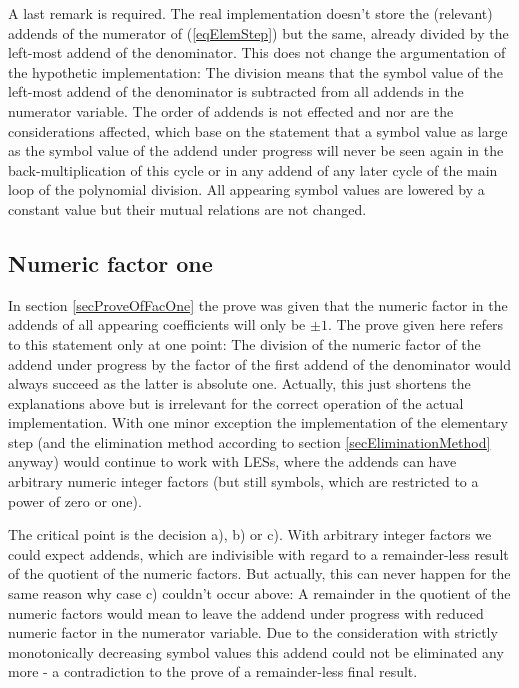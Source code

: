 A last remark is required. The real implementation doesn't store the
(relevant) addends of the numerator of (\ref{eqElemStep}) but the same,
already divided by the left-most addend of the denominator. This does not
change the argumentation of the hypothetic implementation: The division
means that the symbol value of the left-most addend of the denominator is
subtracted from all addends in the numerator variable. The order of
addends is not effected and nor are the considerations affected, which
base on the statement that a symbol value as large as the symbol value of
the addend under progress will never be seen again in the
back-multiplication of this cycle or in any addend of any later cycle of the
main loop of the polynomial division. All appearing symbol values are lowered
by a constant value but their mutual relations are not changed.


\subsection{Numeric factor one}

In section \ref{secProveOfFacOne} the prove was given that the numeric
factor in the addends of all appearing coefficients will only be $\pm 1$.
The prove given here refers to this statement only at one point: The
division of the numeric factor of the addend under progress by the factor
of the first addend of the denominator would always succeed as the latter
is absolute one. Actually, this just shortens the explanations above but
is irrelevant for the correct operation of the actual implementation. With
one minor exception the implementation of the elementary step (and the
elimination method according to section \ref{secEliminationMethod} anyway)
would continue to work with LESs, where the addends can have arbitrary numeric
integer factors (but still symbols, which are restricted to a power of
zero or one).

The critical point is the decision a), b) or c). With arbitrary integer
factors we could expect addends, which are indivisible with regard to a
remainder-less result of the quotient of the numeric factors. But
actually, this can never happen for the same reason why case c) couldn't
occur above: A remainder in the quotient of the numeric factors would mean
to leave the addend under progress with reduced numeric factor in the
numerator variable. Due to the consideration with strictly monotonically
decreasing symbol values this addend could not be eliminated any more - a
contradiction to the prove of a remainder-less final result.

